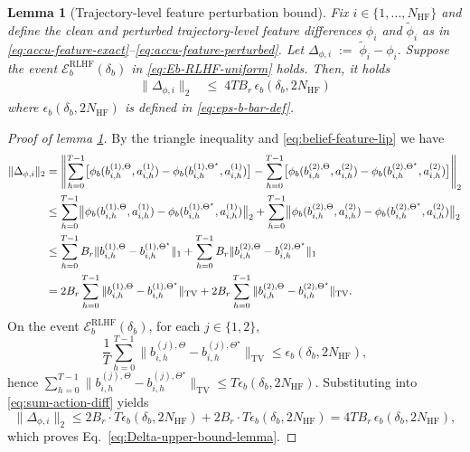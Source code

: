 \documentclass[10pt]{article} %
\theoremstyle{plain}
\newtheorem{lemma}[theorem]{Lemma}
\theoremstyle{definition}
\theoremstyle{remark}
\begin{document}
\begin{lemma}[Trajectory-level feature perturbation bound]\label{lem:Delta-Bound}
Fix $i\in\{1,\dots,N_{\mathrm{HF}}\}$ and define the clean and perturbed trajectory-level feature differences
$\phi_i$ and $\tilde\phi_i$ as in \ref{eq:accu-feature-exact}--\ref{eq:accu-feature-perturbed}. Let \(
\Delta_{\phi,i}\;:=\;\tilde\phi_i-\phi_i.
\) Suppose the event
$\mathcal E_{b}^{\mathrm{RLHF}}(\delta_b)$ in \ref{eq:Eb-RLHF-uniform} holds. Then, it holds
\begin{align}
\|\Delta_{\phi,i}\|_2
&\le\;4T B_r\,\epsilon_b(\delta_b, 2N_{\mathrm{HF}}) 
\label{eq:Delta-upper-bound-lemma}
\end{align}
where $\epsilon_b(\delta_b, 2N_{\mathrm{HF}})$ is defined in \ref{eq:eps-b-bar-def}.
\end{lemma}


\begin{proof}[Proof of lemma \ref{lem:Delta-Bound}]\label{proof:lem.1}
By the triangle inequality and \ref{eq:belief-feature-lip} we have
\begin{align}
\|\Delta_{\phi,i}\|_2 &= \left\| \sum_{h=0}^{T-1} \bigl[\phi_b(b_{i,h}^{(1),\Theta}, a_{i,h}^{(1)}) - \phi_b(b_{i,h}^{(1),\Theta^\star},a_{i,h}^{(1)})\bigr] 
- \sum_{h=0}^{T-1} \bigl[\phi_b(b_{i,h}^{(2),\Theta}, a_{i,h}^{(2)}) - \phi_b(b_{i,h}^{(2),\Theta^\star},a_{i,h}^{(2)})\bigr] \right\|_2 \notag\\
&\le \sum_{h=0}^{T-1} \bigl\|\phi_b(b_{i,h}^{(1),\Theta}, a_{i,h}^{(1)}) - \phi_b(b_{i,h}^{(1),\Theta^\star},a_{i,h}^{(1)})\bigr\|_2 
+ \sum_{h=0}^{T-1} \bigl\|\phi_b(b_{i,h}^{(2),\Theta}, a_{i,h}^{(2)}) - \phi_b(b_{i,h}^{(2),\Theta^\star},a_{i,h}^{(2)})\bigr\|_2 \notag\\
&\le \sum_{h=0}^{T-1} B_r\|b_{i,h}^{(1),\Theta}-b_{i,h}^{(1),\Theta^\star}\|_1
+\sum_{h=0}^{T-1} B_r\|b_{i,h}^{(2),\Theta}-b_{i,h}^{(2),\Theta^\star}\|_1 \notag\\
&= 2B_r\sum_{h=0}^{T-1}\|b_{i,h}^{(1),\Theta}-b_{i,h}^{(1),\Theta^\star}\|_{\mathrm{TV}}
+2B_r\sum_{h=0}^{T-1}\|b_{i,h}^{(2),\Theta}-b_{i,h}^{(2),\Theta^\star}\|_{\mathrm{TV}}.\label{eq:sum-action-diff}
\end{align}
On the event $\mathcal E_{b}^{\mathrm{RLHF}}(\delta_b)$, for each $j\in\{1,2\}$,
\[
\frac{1}{T}\sum_{h=0}^{T-1}\|b_{i,h}^{(j),\Theta}-b_{i,h}^{(j),\Theta^\star}\|_{\mathrm{TV}} \le \epsilon_b(\delta_b, 2N_{\mathrm{HF}}),
\]
hence \(\sum_{h=0}^{T-1}\|b_{i,h}^{(j),\Theta}-b_{i,h}^{(j),\Theta^\star}\|_{\mathrm{TV}}
\le T\epsilon_b(\delta_b, 2N_{\mathrm{HF}})\).
Substituting into \ref{eq:sum-action-diff} yields
\[
\|\Delta_{\phi,i}\|_2\le 2B_r\cdot T\epsilon_b(\delta_b, 2N_{\mathrm{HF}})+2B_r\cdot T\epsilon_b(\delta_b, 2N_{\mathrm{HF}}) =4T B_r\,\epsilon_b(\delta_b, 2N_{\mathrm{HF}}),
\]
which proves Eq.~\ref{eq:Delta-upper-bound-lemma}.
 

 
\end{proof}
\end{document}
